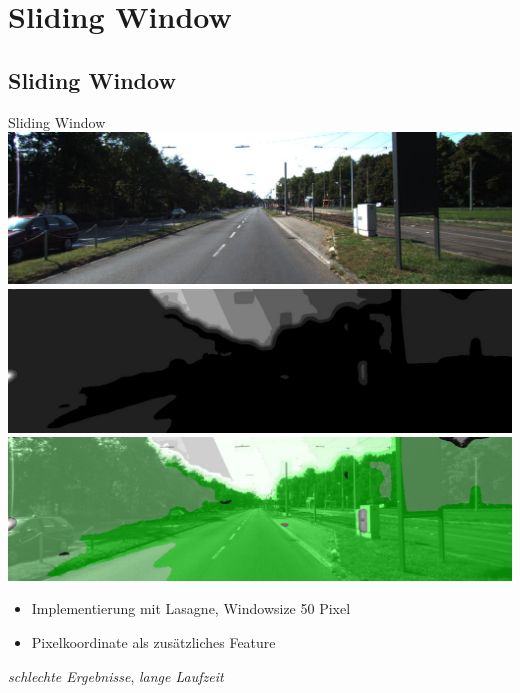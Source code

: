 \section{Sliding Window}

\subsection{Sliding Window}

\begin{frame}{Sliding Window}
  \includegraphics[scale=0.11]{../Images/Lasagne/padded.jpg}
  \hspace{0.1cm}
      \includegraphics[scale=0.12]{../Images/Lasagne/29x29-color-coordinates.jpg}
         \vspace{0.1cm}
    \includegraphics[scale=0.2]{../Images/Lasagne/29x29-color-coordinates-overlay.jpg}
         \begin{itemize}
       \item Implementierung mit Lasagne, Windowsize 50 Pixel
        \item Pixelkoordinate als zus\"atzliches Feature
    \end{itemize}
  \rightarrow \emph{schlechte Ergebnisse}, \emph{lange Laufzeit}
    
\end{frame}

